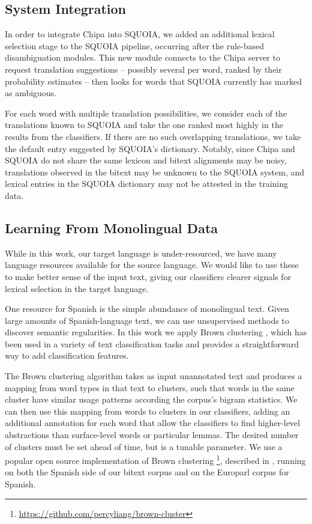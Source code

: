 \documentclass[10pt, a4paper]{article}
\begin{document}
\subsection{System Integration}
In order to integrate Chipa into SQUOIA, we added an additional lexical
selection stage to the SQUOIA pipeline, occurring after the rule-based
disambiguation modules. This new module connects to the Chipa server to request
translation suggestions -- possibly several per word, ranked by their
probability estimates -- then looks for words that SQUOIA currently has marked
as ambiguous.

For each word with multiple translation possibilities, we consider each of the
translations known to SQUOIA and take the one ranked most highly in the
results from the classifiers. If there are no such overlapping translations, we
take the default entry suggested by SQUOIA's dictionary.
Notably, since Chipa and SQUOIA do not share the same lexicon and bitext alignments
may be noisy, translations
observed in the bitext may be unknown to the SQUOIA system, and lexical entries in the
SQUOIA dictionary may not be attested in the training data.

\subsection{Learning From Monolingual Data}
While in this work, our target language is under-resourced, we have many
language resources available for the source language. We would like to use these to
make better sense of the input text, giving our classifiers clearer signals for
lexical selection in the target language.

One resource for Spanish is the simple abundance of monolingual text. Given
large amounts of Spanish-language text, we can use unsupervised methods to
discover semantic regularities. In this work we apply Brown clustering
\cite{Brown92class-basedn-gram}, which has been used in a variety of text
classification tasks \cite{turian-ratinov-bengio:2010:ACL} and provides a
straightforward way to add classification features.

The Brown clustering algorithm takes as input unannotated text and produces a
mapping from word types in that text to clusters, such that words in the same
cluster have similar usage patterns according the corpus's bigram statistics.
We can then use this mapping from words to clusters in our classifiers, adding
an additional annotation for each word that allow the classifiers to find
higher-level abstractions than surface-level words or particular lemmas.
The desired number of clusters must be set ahead of time, but is a tunable
parameter.
We use a popular open source implementation of Brown clustering
\footnote{\url{https://github.com/percyliang/brown-cluster}}, described in
\cite{Liang05semi-supervisedlearning}, running on both the Spanish side of our
bitext corpus and on the Europarl corpus \cite{europarl} for Spanish.
\end{document}

